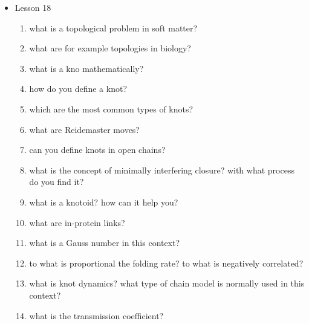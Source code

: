 {\begin{itemize}
\begin{enumerate}
        \item what are the models generally used for polymer modelling?
        \item what are freely jointed chains?
        \item what is a kreatky-porog model?
        \item what is the persistance length? and the kuhn length?
        \item what are self-avoiding chains? how can you describe the average difference in volume?
        \item what is the kremer-grest model?
        \item how can you evaluate the stiffness of a polymer?
        \item main characteristics of DNA
        \item what is oxDNA
        \item what are the resolutions types used on the base of the length wanted
        \item what is a crumpled globule model?
    \end{enumerate}
    \item Lesson 18
    \begin{enumerate}
        \item what is a topological problem in soft matter?
        \item what are for example topologies in biology?
        \item what is a kno mathematically?
        \item how do you define a knot?
        \item which are the most common types of knots?
        \item what are Reidemaster moves?
        \item can you define knots in open chains?
        \item what is the concept of minimally interfering closure? with what process do you find it?
        \item what is a knotoid? how can it help you?
        \item what are in-protein links?
        \item what is a Gauss number in this context?
        \item to what is proportional the folding rate? to what is negatively correlated?
        \item what is knot dynamics? what type of chain model is normally used in this context?
        \item what is the transmission coefficient?

\end{enumerate}
\end{itemize}}
